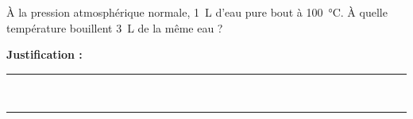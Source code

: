 À la pression atmosphérique normale, \qty{1}{L} d'eau pure bout à \qty{100}{\degreeCelsius}. À quelle température bouillent \qty{3}{L} de la même eau ?

\choices

\noindent\textbf{Justification :} \hrulefill \\[2.5ex]
\rule{\linewidth}{0.4pt} \\[2.5ex]
\rule{\linewidth}{0.4pt}
\vfill
